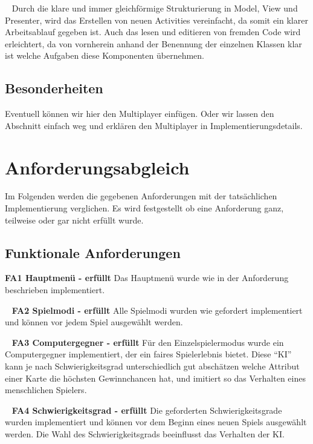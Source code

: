 \documentclass{scrartcl}
\begin{document}
\ \newline
Durch die klare und immer gleichförmige Strukturierung in Model, View und
Presenter, wird das Erstellen von neuen Activities vereinfacht, da somit ein
klarer Arbeitsablauf gegeben ist. Auch das lesen und editieren von fremden Code
wird erleichtert, da von vornherein anhand der Benennung der einzelnen Klassen
klar ist welche Aufgaben diese Komponenten übernehmen.

\subsection{Besonderheiten}

Eventuell können wir hier den Multiplayer einfügen. Oder wir lassen den
Abschnitt einfach weg und erklären den Multiplayer in Implementierungsdetails.

\section{Anforderungsabgleich}

Im Folgenden werden die gegebenen Anforderungen mit der tatsächlichen
Implementierung verglichen. Es wird festgestellt ob eine Anforderung ganz,
teilweise oder gar nicht erfüllt wurde.

\subsection{Funktionale Anforderungen}

\textbf{FA1 Hauptmenü - erfüllt} \newline
Das Hauptmenü wurde wie in der Anforderung beschrieben implementiert.

\ \newline
\textbf{FA2 Spielmodi - erfüllt} \newline
Alle Spielmodi wurden wie gefordert implementiert und können vor jedem Spiel
ausgewählt werden.

\ \newline
\textbf{FA3 Computergegner - erfüllt} \newline
Für den Einzelspielermodus wurde ein Computergegner implementiert, der ein
faires Spielerlebnis bietet. Diese \enquote{KI} kann je nach Schwierigkeitsgrad
unterschiedlich gut abschätzen welche Attribut einer Karte die höchsten
Gewinnchancen hat, und imitiert so das Verhalten eines menschlichen Spielers.

\ \newline
\textbf{FA4 Schwierigkeitsgrad - erfüllt} \newline
Die geforderten Schwierigkeitsgrade wurden implementiert und können vor dem
Beginn eines neuen Spiels ausgewählt werden. Die Wahl des Schwierigkeitsgrads
beeinflusst das Verhalten der KI.
\end{document}
